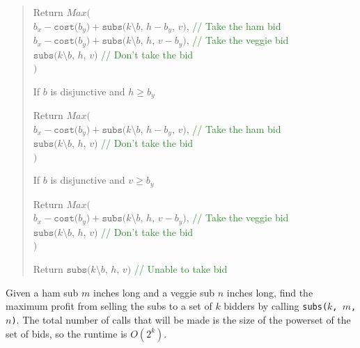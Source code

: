 \documentclass[letterpaper,11pt]{article}
\begin{document}
\begin{quote}
\begin{steps}
        \begin{steps}
            \item Return $Max($
            \\ \hphantom{    } $b_x - \texttt{cost($b_y$)} + \texttt{subs($k \setminus b$, $h-b_y$, $v$)}$, \textcolor{ForestGreen}{// Take the ham bid}
            \\ \hphantom{    } $b_x - \texttt{cost($b_y$)} + \texttt{subs($k \setminus b$, $h$, $v-b_y$)}$, \textcolor{ForestGreen}{// Take the veggie bid}
            \\ \hphantom{    } $\texttt{subs($k \setminus b$, $h$, $v$)}$ \textcolor{ForestGreen}{// Don't take the bid}
            \\ $)$
        \end{steps}
        \item If $b$ is disjunctive and $h \geq b_y$
        \begin{steps}
            \item Return $Max($
            \\ \hphantom{    } $b_x - \texttt{cost($b_y$)} + \texttt{subs($k \setminus b$, $h-b_y$, $v$)}$, \textcolor{ForestGreen}{// Take the ham bid}
            \\ \hphantom{    } $\texttt{subs($k \setminus b$, $h$, $v$)}$ \textcolor{ForestGreen}{// Don't take the bid}
            \\ $)$
        \end{steps}
        \item If $b$ is disjunctive and $v \geq b_y$
        \begin{steps}
            \item Return $Max($
            \\ \hphantom{    } $b_x - \texttt{cost($b_y$)} + \texttt{subs($k \setminus b$, $h$, $v-b_y$)}$, \textcolor{ForestGreen}{// Take the veggie bid}
            \\ \hphantom{    } $\texttt{subs($k \setminus b$, $h$, $v$)}$ \textcolor{ForestGreen}{// Don't take the bid}
            \\ $)$
        \end{steps}
        \item Return $\texttt{subs($k \setminus b$, $h$, $v$)}$ \textcolor{ForestGreen}{// Unable to take bid}
    \end{steps}
\end{quote}

Given a ham sub $m$ inches long and a veggie sub $n$ inches long, find the
maximum profit from selling the subs to a set of $k$ bidders by calling
\texttt{subs($k$, $m$, $n$)}. The total number of calls that will be made is the
size of the powerset of the set of bids, so the runtime is $O(2^k)$.
\end{document}
